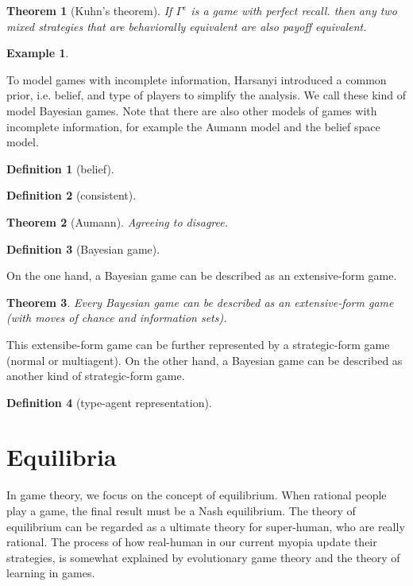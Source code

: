 \documentclass{article}
\newtheorem{Thm}{Theorem}[section]
\newtheorem{Eg}{Example}[section]
\theoremstyle{definition}
\newtheorem{Def}{Definition}[section]
\begin{document}
\begin{Thm}[Kuhn's theorem]
    If $\Gamma^e$ is a game with perfect recall. then any two mixed strategies that are behaviorally equivalent are also payoff equivalent.
\end{Thm}




\begin{Eg}
    
\end{Eg}

To model games with incomplete information, Harsanyi introduced a common prior, i.e. belief, and type of players to simplify the analysis.
We call these kind of model Bayesian games. Note that there are also other models of games with incomplete information, for example the Aumann model and the belief space model.

\begin{Def}[belief]
    
\end{Def}

\begin{Def}[consistent]
    
\end{Def}

\begin{Thm}[Aumann]
    Agreeing to disagree.
\end{Thm}

\begin{Def}[Bayesian game]
    
\end{Def}
On the one hand, a Bayesian game can be described as an extensive-form game.
\begin{Thm}
    Every Bayesian game can be described as an extensive-form game (with moves of chance and information sets).
\end{Thm}
This extensibe-form game can be further represented by a strategic-form game (normal or multiagent).
On the other hand, a Bayesian game can be described as another kind of strategic-form game.
\begin{Def}[type-agent representation]
    
\end{Def}



\section{Equilibria}
In game theory, we focus on the concept of equilibrium. When rational people play a game, the final result must be a Nash equilibrium.
The theory of equilibrium can be regarded as a ultimate theory for super-human, who are really rational.
The process of how real-human in our current myopia update their strategies, is somewhat explained by evolutionary game theory
and the theory of learning in games.
\end{document}

